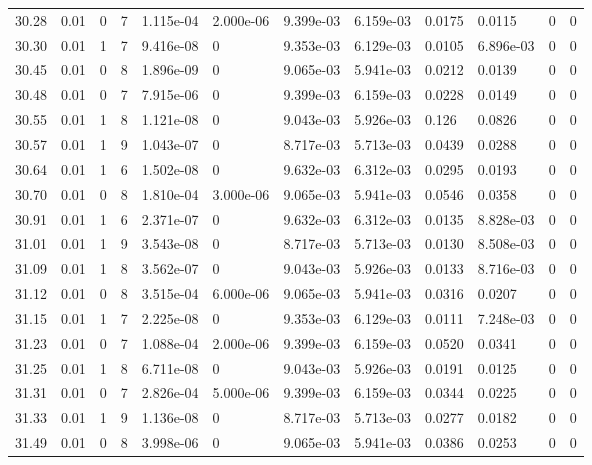 \documentclass[preview]{standalone}
\begin{document}
{{{{{{{{{{{\begin{tabular}{L{1.2cm}C{1.2cm} C{0.3cm}C{0.5cm} C{1.4cm}C{1.4cm} C{1.4cm}C{1.4cm} C{1.6cm}C{1.6cm} C{1.6cm}C{1.6cm}}
  30.28  &  0.01  & 0     &  7 &  1.115e-04  & 2.000e-06  &  9.399e-03&   6.159e-03& 0.0175 & 0.0115   &  0 & 0  \\ 
  30.30  &  0.01  & 1     &  7 &  9.416e-08  & 0  &  9.353e-03&   6.129e-03& 0.0105 & 6.896e-03   &  0 & 0  \\ 
  30.45  &  0.01  & 0     &  8 &  1.896e-09  & 0  &  9.065e-03&   5.941e-03& 0.0212 & 0.0139   &  0 & 0  \\ 
  30.48  &  0.01  & 0     &  7 &  7.915e-06  & 0  &  9.399e-03&   6.159e-03& 0.0228 & 0.0149   &  0 & 0  \\ 
  30.55  &  0.01  & 1     &  8 &  1.121e-08  & 0  &  9.043e-03&   5.926e-03& 0.126 & 0.0826   &  0 & 0  \\ 
  30.57  &  0.01  & 1     &  9 &  1.043e-07  & 0  &  8.717e-03&   5.713e-03& 0.0439 & 0.0288   &  0 & 0  \\ 
  30.64  &  0.01  & 1     &  6 &  1.502e-08  & 0  &  9.632e-03&   6.312e-03& 0.0295 & 0.0193   &  0 & 0  \\ 
  30.70  &  0.01  & 0     &  8 &  1.810e-04  & 3.000e-06  &  9.065e-03&   5.941e-03& 0.0546 & 0.0358   &  0 & 0  \\ 
  30.91  &  0.01  & 1     &  6 &  2.371e-07  & 0  &  9.632e-03&   6.312e-03& 0.0135 & 8.828e-03   &  0 & 0  \\ 
  31.01  &  0.01  & 1     &  9 &  3.543e-08  & 0  &  8.717e-03&   5.713e-03& 0.0130 & 8.508e-03   &  0 & 0  \\ 
  31.09  &  0.01  & 1     &  8 &  3.562e-07  & 0  &  9.043e-03&   5.926e-03& 0.0133 & 8.716e-03   &  0 & 0  \\ 
  31.12  &  0.01  & 0     &  8 &  3.515e-04  & 6.000e-06  &  9.065e-03&   5.941e-03& 0.0316 & 0.0207   &  0 & 0  \\ 
  31.15  &  0.01  & 1     &  7 &  2.225e-08  & 0  &  9.353e-03&   6.129e-03& 0.0111 & 7.248e-03   &  0 & 0  \\ 
  31.23  &  0.01  & 0     &  7 &  1.088e-04  & 2.000e-06  &  9.399e-03&   6.159e-03& 0.0520 & 0.0341   &  0 & 0  \\ 
  31.25  &  0.01  & 1     &  8 &  6.711e-08  & 0  &  9.043e-03&   5.926e-03& 0.0191 & 0.0125   &  0 & 0  \\ 
  31.31  &  0.01  & 0     &  7 &  2.826e-04  & 5.000e-06  &  9.399e-03&   6.159e-03& 0.0344 & 0.0225   &  0 & 0  \\ 
  31.33  &  0.01  & 1     &  9 &  1.136e-08  & 0  &  8.717e-03&   5.713e-03& 0.0277 & 0.0182   &  0 & 0  \\ 
  31.49  &  0.01  & 0     &  8 &  3.998e-06  & 0  &  9.065e-03&   5.941e-03& 0.0386 & 0.0253   &  0 & 0  \\ 

\end{tabular}}}}}}}}}}}}
\end{document}
